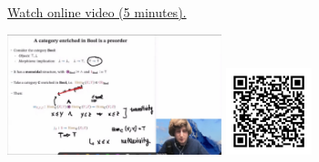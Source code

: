 
\begin{minipage}{10cm}
    \href{https://act4e-spring21.netlify.app/videos/spring2021-enrichment:bool-enriched.html}{Watch online video (5 minutes).}
        
    \href{https://act4e-spring21.netlify.app/videos/spring2021-enrichment:bool-enriched.html}{\includegraphics[height=3.5cm]{spring2021-enrichment:bool-enriched/thumbnails.jpg}}
    \href{https://act4e-spring21.netlify.app/videos/spring2021-enrichment:bool-enriched.html}{\includegraphics[height=2.5cm]{spring2021-enrichment:bool-enriched/qrcode.png}}
\end{minipage}
